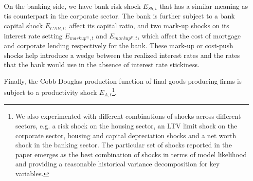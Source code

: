 \documentclass[12pt]{article}
\numberwithin{equation}{section}
\begin{document}
On the banking side, we have bank risk shock $E_{Sb,t}$ that has a similar meaning  as tis counterpart in the corporate sector. The bank is further subject to a bank capital shock $E_{CAB,t}$, affect its capital ratio, and two mark-up shocks on its interest rate setting $E_{markup^m,t}$ and $E_{markup^F,t}$, which affect the cost of mortgage and corporate lending respectively for the bank. These mark-up or cost-push shocks help introduce a wedge between the realized interest rates and the rates that the bank would use in the absence of interest rate stickiness. 

Finally, the Cobb-Douglas production function of final goods producing firms is subject to a productivity shock $E_{A,t}$\footnote{We also experimented with different combinations of shocks across different sectors, e.g. a risk shock on the housing sector, an LTV limit shock on the corporate sector, housing and capital depreciation shocks and a net worth shock in the banking sector. The particular set of shocks reported in the paper emerges as the best combination of shocks in terms of model likelihood and providing a reasonable historical variance decomposition for key variables.}. 



\end{document}
